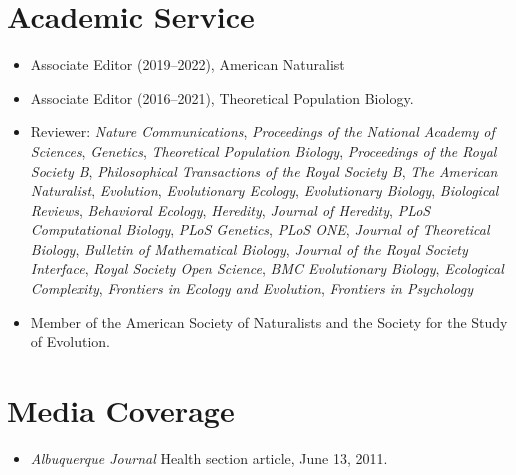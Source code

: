 \documentclass[11pt]{article}
\begin{document}
  \section{Academic Service}
  \begin{itemize}
    \item Associate Editor (2019--2022), American Naturalist
    \item Associate Editor (2016--2021), Theoretical Population Biology.
    \item Reviewer: \textit{Nature Communications}, \textit{Proceedings of the National Academy of Sciences}, \textit{Genetics}, \textit{Theoretical Population Biology}, \textit{Proceedings of the Royal Society B}, \textit{Philosophical Transactions of the Royal Society B}, \textit{The American Naturalist}, \textit{Evolution}, \textit{Evolutionary Ecology}, \textit{Evolutionary Biology}, \textit{Biological Reviews}, \textit{Behavioral Ecology}, \textit{Heredity}, \textit{Journal of Heredity}, \textit{PLoS Computational Biology}, \textit{PLoS Genetics}, \textit{PLoS ONE}, \textit{Journal of Theoretical Biology}, \textit{Bulletin of Mathematical Biology}, \textit{Journal of the Royal Society Interface}, \textit{Royal Society Open Science}, \textit{BMC Evolutionary Biology}, \textit{Ecological Complexity}, \textit{Frontiers in Ecology and Evolution}, \textit{Frontiers in Psychology}
  \item Member of the American Society of Naturalists and the Society for the Study of Evolution.
  \end{itemize}
  

  \section{Media Coverage}
  \begin{itemize}
  \item \textit{Albuquerque Journal} Health section article, June 13, 2011.
  \end{itemize}

\end{document}
